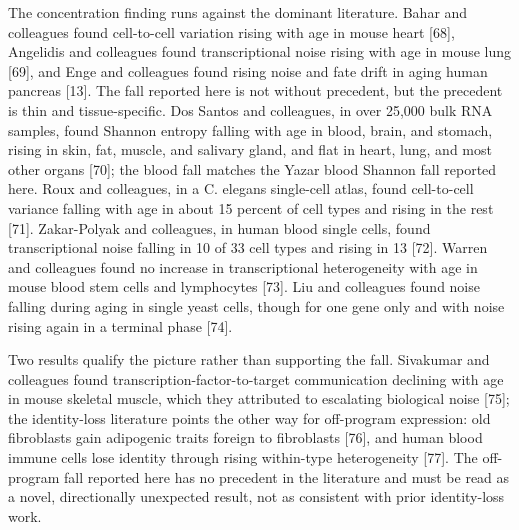 \documentclass[11pt]{article}
\begin{document}
The concentration finding runs against the dominant literature. Bahar and colleagues found cell-to-cell variation rising with age in mouse heart [68], Angelidis and colleagues found transcriptional noise rising with age in mouse lung [69], and Enge and colleagues found rising noise and fate drift in aging human pancreas [13]. The fall reported here is not without precedent, but the precedent is thin and tissue-specific. Dos Santos and colleagues, in over 25,000 bulk RNA samples, found Shannon entropy falling with age in blood, brain, and stomach, rising in skin, fat, muscle, and salivary gland, and flat in heart, lung, and most other organs [70]; the blood fall matches the Yazar blood Shannon fall reported here. Roux and colleagues, in a C. elegans single-cell atlas, found cell-to-cell variance falling with age in about 15 percent of cell types and rising in the rest [71]. Zakar-Polyak and colleagues, in human blood single cells, found transcriptional noise falling in 10 of 33 cell types and rising in 13 [72]. Warren and colleagues found no increase in transcriptional heterogeneity with age in mouse blood stem cells and lymphocytes [73]. Liu and colleagues found noise falling during aging in single yeast cells, though for one gene only and with noise rising again in a terminal phase [74].

Two results qualify the picture rather than supporting the fall. Sivakumar and colleagues found transcription-factor-to-target communication declining with age in mouse skeletal muscle, which they attributed to escalating biological noise [75]; the identity-loss literature points the other way for off-program expression: old fibroblasts gain adipogenic traits foreign to fibroblasts [76], and human blood immune cells lose identity through rising within-type heterogeneity [77]. The off-program fall reported here has no precedent in the literature and must be read as a novel, directionally unexpected result, not as consistent with prior identity-loss work.
\end{document}
